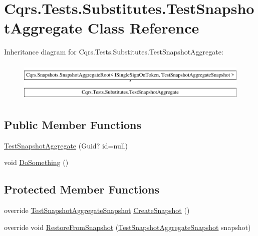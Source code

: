 \hypertarget{classCqrs_1_1Tests_1_1Substitutes_1_1TestSnapshotAggregate}{}\section{Cqrs.\+Tests.\+Substitutes.\+Test\+Snapshot\+Aggregate Class Reference}
\label{classCqrs_1_1Tests_1_1Substitutes_1_1TestSnapshotAggregate}
Inheritance diagram for Cqrs.\+Tests.\+Substitutes.\+Test\+Snapshot\+Aggregate\+:\begin{figure}[H]
\begin{center}
\leavevmode
\includegraphics[height=1.927711cm]{classCqrs_1_1Tests_1_1Substitutes_1_1TestSnapshotAggregate}
\end{center}
\end{figure}
\subsection*{Public Member Functions}
\begin{DoxyCompactItemize}
\item 
\hyperlink{classCqrs_1_1Tests_1_1Substitutes_1_1TestSnapshotAggregate_aeb457b965fe66b7cb642a79e82b3c7ce_aeb457b965fe66b7cb642a79e82b3c7ce}{Test\+Snapshot\+Aggregate} (Guid? id=null)
\item 
void \hyperlink{classCqrs_1_1Tests_1_1Substitutes_1_1TestSnapshotAggregate_ae61a113a0510a62822cebf575fa7d982_ae61a113a0510a62822cebf575fa7d982}{Do\+Something} ()
\end{DoxyCompactItemize}
\subsection*{Protected Member Functions}
\begin{DoxyCompactItemize}
\item 
override \hyperlink{classCqrs_1_1Tests_1_1Substitutes_1_1TestSnapshotAggregateSnapshot}{Test\+Snapshot\+Aggregate\+Snapshot} \hyperlink{classCqrs_1_1Tests_1_1Substitutes_1_1TestSnapshotAggregate_a423bba964aa7fe1f8e89fbb153d7db37_a423bba964aa7fe1f8e89fbb153d7db37}{Create\+Snapshot} ()
\item 
override void \hyperlink{classCqrs_1_1Tests_1_1Substitutes_1_1TestSnapshotAggregate_aeebfef7170bfd350e4ae2bccf11e60ee_aeebfef7170bfd350e4ae2bccf11e60ee}{Restore\+From\+Snapshot} (\hyperlink{classCqrs_1_1Tests_1_1Substitutes_1_1TestSnapshotAggregateSnapshot}{Test\+Snapshot\+Aggregate\+Snapshot} snapshot)
\end{DoxyCompactItemize}
